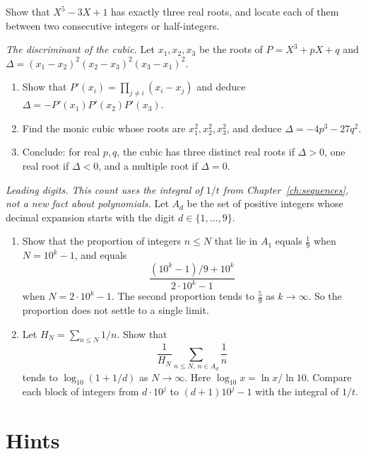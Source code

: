 \begin{exercise}[$\star\star$]\label{ex:descartes}
Show that $X^5-3X+1$ has exactly three real roots, and locate each of them between two consecutive integers or half-integers.
\end{exercise}

\begin{exercise}[$\star\star\star$]\label{ex:disc}
\emph{The discriminant of the cubic.} Let $x_1,x_2,x_3$ be the roots of $P=X^3+pX+q$ and $\Delta=(x_1-x_2)^2(x_2-x_3)^2(x_3-x_1)^2$.
\begin{enumerate}[label=(\alph*)]
\item Show that $P'(x_i)=\prod_{j\ne i}(x_i-x_j)$ and deduce $\Delta=-P'(x_1)P'(x_2)P'(x_3)$.
\item Find the monic cubic whose roots are $x_1^2,x_2^2,x_3^2$, and deduce $\Delta=-4p^3-27q^2$.
\item Conclude: for real $p,q$, the cubic has three distinct real roots if $\Delta>0$, one real root if $\Delta<0$, and a multiple root if $\Delta=0$.
\end{enumerate}
\end{exercise}

\begin{exercise}[$\star\star$]\label{pb:benford}
\emph{Leading digits. This count uses the integral of $1/t$ from Chapter~\ref{ch:sequences}, not a new fact about polynomials.} Let $A_d$ be the set of positive integers whose decimal expansion starts with the digit $d\in\{1,\dots,9\}$.
\begin{enumerate}[label=(\alph*)]
\item Show that the proportion of integers $n\le N$ that lie in $A_1$ equals $\frac19$ when $N=10^k-1$, and equals
\[
\frac{(10^k-1)/9+10^k}{2\cdot 10^k-1}
\]
when $N=2\cdot 10^k-1$. The second proportion tends to $\frac59$ as $k\to\infty$. So the proportion does not settle to a single limit.
\item Let $H_N=\sum_{n\le N}1/n$. Show that
\[
\frac1{H_N}\sum_{n\le N,\ n\in A_d}\frac1n
\]
tends to $\log_{10}(1+1/d)$ as $N\to\infty$. Here $\log_{10} x=\ln x/\ln 10$. Compare each block of integers from $d\cdot 10^j$ to $(d+1)10^j-1$ with the integral of $1/t$.
\end{enumerate}
\end{exercise}

\section{Hints}

